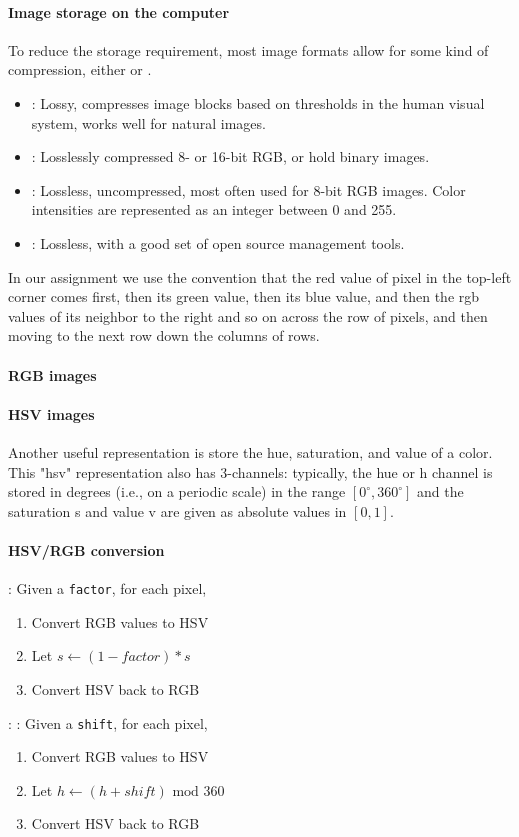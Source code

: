 \documentclass[11pt]{article}
\numberwithin{equation}{section}
\begin{document}
\paragraph{Image storage on the computer}
To reduce the storage requirement, most image formats allow for some kind of compression, either  or .
\begin{itemize}
	\item {}: Lossy, compresses image blocks based on thresholds in the human visual system, works well for natural images.
	\item {}: Losslessly compressed 8- or 16-bit RGB, or hold binary images.
	\item {}: Lossless, uncompressed, most often used for 8-bit RGB images. Color intensities are represented as an integer between 0 and 255.
	\item {}: Lossless, with a good set of open source management tools. 
\end{itemize}
In our assignment we use the convention that the red value of pixel in the top-left corner comes first, then its green value, then its blue value, and then the rgb values of its neighbor to the right and so on across the row of pixels, and then moving to the next row down the columns of rows.

\paragraph{RGB images}

\paragraph{HSV images}
Another useful representation is store the hue, saturation, and value of a color. This "hsv" representation also has 3-channels: typically, the hue or h channel is stored in degrees (i.e., on a periodic scale) in the range $[0^\circ, 360^\circ]$ and the saturation s and value v are given as absolute values in $[0,1]$.

\paragraph{HSV/RGB conversion}
: Given a \texttt{factor}, for each pixel,
\begin{enumerate}
	\item Convert RGB values to HSV
	\item Let $s \gets (1-factor) * s$
	\item Convert HSV back to RGB
\end{enumerate}
:
: Given a \texttt{shift}, for each pixel,
\begin{enumerate}
	\item Convert RGB values to HSV
	\item Let $h \gets (h + shift) \text{ mod } 360$
	\item Convert HSV back to RGB
\end{enumerate}
\end{document}
